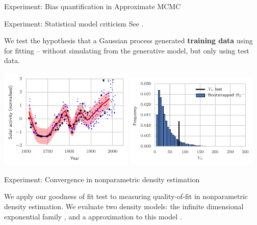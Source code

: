\begin{frame}
\begin{columns}
\begin{column}{.32\linewidth}
\begin{block}{Experiment: Bias quantification in Approximate MCMC}
\end{block}
\vspace{-0.75cm}
\begin{block}{Experiment: Statistical model criticism}
See \cite{lloyd2015statistical}.
\begin{center}
\item We test the hypothesis that a Gaussian process generated \textbf{training data} using for fitting -- without simulating from the generative model, but only using {\color{red} test data}.
\end{center}
\includegraphics[width=0.48\textwidth]{../../presentation/img/gp_regression_data_fit.pdf} \includegraphics[width=0.48\textwidth]{../../presentation/img/gp_regression_bootstrap_hist} 
\begin{minipage}{.35\linewidth}

\end{minipage}
\end{block}

\vspace{-0.75cm}

\begin{block}{Experiment: Convergence in nonparametric density estimation}

 

We apply our goodness of fit test to measuring quality-of-fit in nonparametric density estimation. We evaluate two
density models: the infinite dimensional exponential family \cite{SriFukKumGreHyv14}, and a  approximation to this model \cite{strathmann2015gradient}.
% 


\end{block}
\end{column}
\end{columns}
\end{frame}
